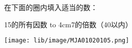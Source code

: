 在下面的圈内填入适当的数：

\hspace{4cm}15的所有因数 \hbox to 4cm{}7的倍数（40以内）
\begin{center}
    \texttt{[image: lib/image/MJA01020105.png]}
\end{center}